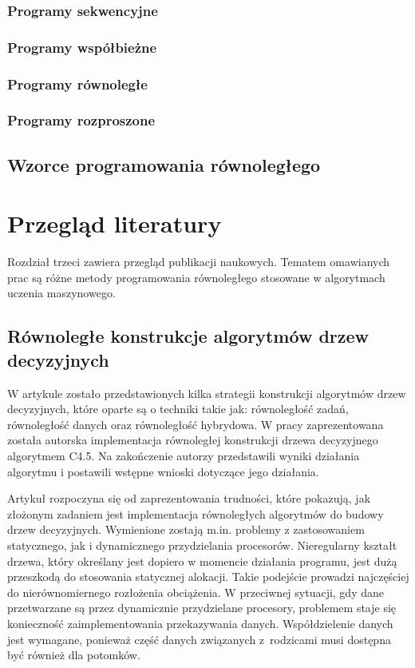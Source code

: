 \documentclass[12pt]{article}
\begin{document}
\subsubsection*{Programy sekwencyjne}

\subsubsection*{Programy współbieżne}

\subsubsection*{Programy równoległe}

\subsubsection*{Programy rozproszone}

\subsection{Wzorce programowania równoległego}

\newpage

\section{Przegląd literatury}

Rozdział trzeci zawiera przegląd publikacji naukowych. Tematem omawianych prac są różne metody programowania równoległego stosowane
w algorytmach uczenia maszynowego.

\subsection{Równoległe konstrukcje algorytmów drzew decyzyjnych}

W artykule \cite{parallel-implementation-decision-tree} zostało przedstawionych kilka strategii konstrukcji algorytmów drzew decyzyjnych, które oparte są o techniki takie jak: równoległość zadań,
równoległość danych oraz równoległość hybrydowa. W pracy zaprezentowana została autorska implementacja równoległej konstrukcji drzewa
decyzyjnego algorytmem C4.5. Na zakończenie autorzy przedstawili wyniki działania algorytmu i postawili wstępne wnioski dotyczące jego działania.

Artykuł rozpoczyna się od zaprezentowania trudności, które pokazują, jak złożonym zadaniem jest implementacja równoległych
algorytmów do budowy drzew decyzyjnych. Wymienione zostają m.in. problemy z zastosowaniem statycznego, jak i dynamicznego przydzielania procesorów.
Nieregularny kształt drzewa, który określany jest dopiero w momencie działania programu, jest dużą przeszkodą do stosowania statycznej alokacji. Takie podejście prowadzi
najczęściej do nierównomiernego rozłożenia obciążenia. W przeciwnej sytuacji, gdy dane przetwarzane są przez dynamicznie przydzielane procesory, problemem staje się
konieczność zaimplementowania przekazywania danych. Współdzielenie danych jest wymagane, ponieważ część danych związanych z~rodzicami musi dostępna być również dla potomków.
\end{document}
